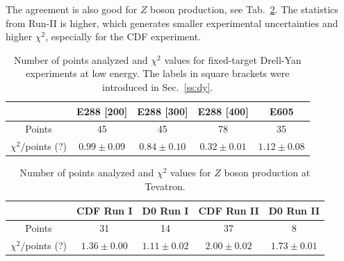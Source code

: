 \documentclass[aps,preprintnumbers,showpacs,nofootinbib,superscriptaddress,floatfix]{revtex4}
\newcommand{\AS}[1]{{\textcolor[rgb]{1,0,1}{#1}}}
\begin{document}
The agreement is also good for $Z$ boson production, see Tab.~\ref{t:fl_ind_chi2_Z}. The statistics from Run-II is higher, which generates smaller experimental uncertainties and higher $\chi^2$, especially for the CDF experiment.
\begin{table}[h!]
\begin{center}
\renewcommand{\tabcolsep}{0.4pc} %
\renewcommand{\arraystretch}{1.2} %
\begin{tabular}{|c|c|c|c|c|}
 \hline
 \hline
 ~                        &  E288 [200]    &  E288 [300]        &  E288 [400]          &  E605                \\
 \hline
 Points                   &      45      &   45             &       78           &     35               \\
 \hline
$ \chi^2  /$\AS{points (?)}      &  $0.99\pm 0.09$        &    $0.84\pm 0.10$           &       $0.32\pm 0.01$ &   $1.12\pm 0.08$     \\
\hline
\hline
\end{tabular}
\caption{Number of points analyzed and $\chi^2$ values for fixed-target Drell-Yan experiments at low energy. The labels in square brackets were introduced in Sec.~\ref{ss:dy}.}
\label{t:fl_ind_chi2_DY}
\end{center}
\end{table}
\begin{table}[h!]
\begin{center}
\renewcommand{\tabcolsep}{0.4pc} %
\renewcommand{\arraystretch}{1.2} %
\begin{tabular}{|c|c|c|c|c|}
 \hline
\hline
 ~                        & CDF Run I    &  D0 Run I        & CDF Run II        & D0 Run II      \\
 \hline
 Points                   &      31      &   14             &       37          &        8       \\
 \hline
$\chi^2 /$\AS{points (?)}      &  $1.36\pm 0.00$        &    $1.11\pm 0.02$           &       $2.00\pm 0.02$         &   $1.73\pm 0.01$     \\
\hline
\hline
\end{tabular}
\caption{Number of points analyzed and $\chi^2$ values for $Z$ boson production at Tevatron.}
\label{t:fl_ind_chi2_Z}
\end{center}
\end{table}
\end{document}
